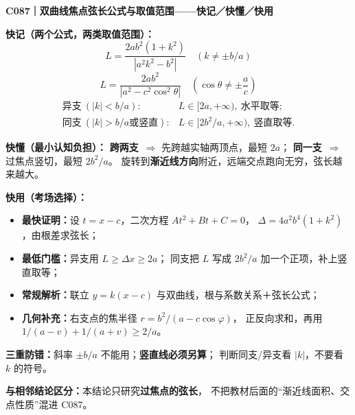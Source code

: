 \clearpage
\begin{summarybox}
\textbf{C087｜双曲线焦点弦长公式与取值范围——快记／快懂／快用}

\textbf{快记（两个公式，两类取值范围）：}
\[
\boxed{L=\frac{2ab^2(1+k^2)}{|a^2k^2-b^2|}\quad(k\ne\pm b/a)}
\]
\[
\boxed{L=\frac{2ab^2}{|a^2-c^2\cos^2\theta|}
\quad\left(\cos\theta\ne\pm\frac ac\right)}
\]
\[
\boxed{\begin{array}{rl}
\text{异支}~(|k|<b/a):&L\in[2a,+\infty),\ \text{水平取等};\\[2pt]
\text{同支}~(|k|>b/a\text{或竖直}):&
L\in[2b^2/a,+\infty),\ \text{竖直取等}.
\end{array}}
\]

\textbf{快懂（最小认知负担）：}
\textbf{跨两支}\ $\Rightarrow$ 先跨越实轴两顶点，最短 $2a$；
\textbf{同一支}\ $\Rightarrow$ 过焦点竖切，最短 $2b^2/a$。
旋转到\textbf{渐近线方向}附近，远端交点跑向无穷，弦长越来越大。

\textbf{快用（考场选择）：}
\begin{itemize}
\item \textbf{最快证明：}设 $t=x-c$，二次方程 $At^2+Bt+C=0$，
$\Delta=4a^2b^4(1+k^2)$，由根差求弦长；
\item \textbf{最低门槛：}异支用 $L\ge\Delta x\ge2a$；
同支把 $L$ 写成 $2b^2/a$ 加一个正项，补上竖直取等；
\item \textbf{常规解析：}联立 $y=k(x-c)$ 与双曲线，根与系数关系＋弦长公式；
\item \textbf{几何补充：}右支点的焦半径 $r=b^2/(a-c\cos\varphi)$，
正反向求和，再用 $1/(a-v)+1/(a+v)\ge2/a$。
\end{itemize}

\textbf{三重防错：}斜率 $\pm b/a$ 不能用；\textbf{竖直线必须另算}；
判断同支/异支看 $|k|$，不要看 $k$ 的符号。

\textbf{与相邻结论区分：}本结论只研究\textbf{过焦点的弦长}，
不把教材后面的“渐近线面积、交点性质”混进 C087。
\end{summarybox}
